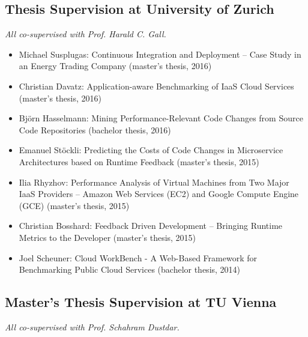 \documentclass[paper=letter,fontsize=11pt]{scrartcl} %
\begin{document}
\subsection*{Thesis Supervision at University of Zurich}

\emph{All co-supervised with Prof. Harald C. Gall.}

\begin{itemize}
  \item Michael Susplugas: Continuous Integration and Deployment -- Case Study in an Energy Trading Company (master's thesis, 2016)
	\item Christian Davatz: Application-aware Benchmarking of IaaS Cloud Services (master's thesis, 2016)
	\item Bj\"orn Hasselmann: Mining Performance-Relevant Code Changes from Source Code Repositories (bachelor thesis, 2016)
  \item Emanuel St\"ockli: Predicting the Costs of Code Changes in Microservice Architectures based on Runtime Feedback  (master's thesis, 2015)
  \item Ilia Rhyzhov: Performance Analysis of Virtual Machines from Two Major IaaS Providers -- Amazon Web Services (EC2) and Google Compute Engine (GCE)  (master's thesis, 2015)
  \item Christian Bosshard: Feedback Driven Development -- Bringing Runtime Metrics to the Developer  (master's thesis, 2015)
  \item Joel Scheuner: Cloud WorkBench - A Web-Based Framework for Benchmarking Public Cloud Services (bachelor thesis, 2014)
\end{itemize}

\subsection*{Master's Thesis Supervision at TU Vienna}

\emph{All co-supervised with Prof. Schahram Dustdar.}
\end{document}
